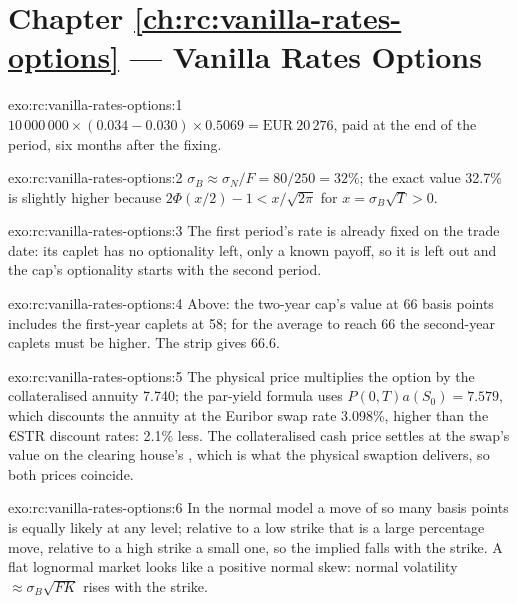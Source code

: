 \section*{Chapter \ref{ch:rc:vanilla-rates-options} --- Vanilla Rates Options}

\begin{solution}{exo:rc:vanilla-rates-options:1}
$10\,000\,000\times(0.034-0.030)\times0.5069 = \text{EUR}~20\,276$, paid at the
end of the period, six months after the fixing.
\end{solution}

\begin{solution}{exo:rc:vanilla-rates-options:2}
$\sigma_B\approx\sigma_N/F = 80/250 = 32\%$; the exact value 32.7\% is slightly
higher because $2\Phi(x/2)-1 < x/\sqrt{2\pi}$ for $x = \sigma_B\sqrt T > 0$.
\end{solution}

\begin{solution}{exo:rc:vanilla-rates-options:3}
The first period's rate is already fixed on the trade date: its caplet has no
optionality left, only a known payoff, so it is left out and the cap's
optionality starts with the second period.
\end{solution}

\begin{solution}{exo:rc:vanilla-rates-options:4}
Above: the two-year cap's value at 66 basis points includes the first-year
caplets at 58; for the average to reach 66 the second-year caplets must be
higher. The strip gives 66.6.
\end{solution}

\begin{solution}{exo:rc:vanilla-rates-options:5}
The physical price multiplies the option by the collateralised annuity 7.740;
the par-yield formula uses $P(0,T)a(S_0) = 7.579$, which discounts the
annuity at the Euribor swap rate 3.098\%, higher than the €STR discount rates:
2.1\% less. The collateralised cash price settles at the swap's value on the
clearing house's , which is what the physical swaption delivers,
so both prices coincide.
\end{solution}

\begin{solution}{exo:rc:vanilla-rates-options:6}
In the normal model a move of so many basis points is equally likely at any
level; relative to a low strike that is a large percentage move, relative to a
high strike a small one, so the implied  falls with the
strike. A flat lognormal market looks like a positive normal skew: normal
volatility $\approx\sigma_B\sqrt{FK}$ rises with the strike.
\end{solution}

